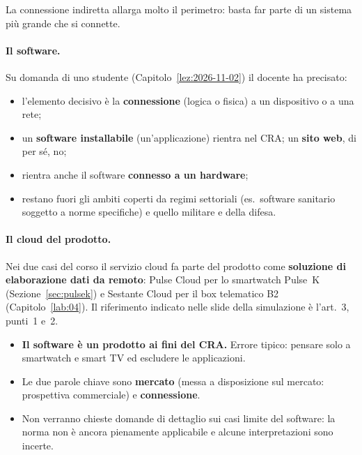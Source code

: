 \noindent La connessione indiretta allarga molto il perimetro: basta far parte di un sistema più grande
che si connette.

\paragraph{Il software.} Su domanda di uno studente (Capitolo~\ref{lez:2026-11-02}) il docente ha
precisato:
\begin{itemize}
  \item l'elemento decisivo è la \textbf{connessione} (logica o fisica) a un dispositivo o a una rete;
  \item un \textbf{software installabile} (un'applicazione) rientra nel CRA; un \textbf{sito web}, di per
    sé, no;
  \item rientra anche il software \textbf{connesso a un hardware};
  \item restano fuori gli ambiti coperti da regimi settoriali (es.\ software sanitario soggetto a norme
    specifiche) e quello militare e della difesa.
\end{itemize}

\paragraph{Il cloud del prodotto.} Nei due casi del corso il servizio cloud fa parte del prodotto come
\textbf{soluzione di elaborazione dati da remoto}: Pulse Cloud per lo smartwatch Pulse~K
(Sezione~\ref{sec:pulsek}) e Sestante Cloud per il box telematico B2 (Capitolo~\ref{lab:04}). Il
riferimento indicato nelle slide della simulazione è l'art.~3, punti~1 e~2.

\begin{esame}
\begin{itemize}
  \item \textbf{Il software è un prodotto ai fini del CRA.} Errore tipico: pensare solo a smartwatch e
    smart TV ed escludere le applicazioni.
  \item Le due parole chiave sono \textbf{mercato} (messa a disposizione sul mercato: prospettiva
    commerciale) e \textbf{connessione}.
  \item Non verranno chieste domande di dettaglio sui casi limite del software: la norma non è ancora
    pienamente applicabile e alcune interpretazioni sono incerte.
\end{itemize}
\end{esame}

